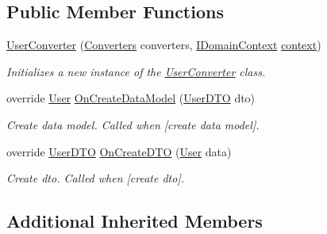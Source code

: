 \subsection*{Public Member Functions}
\begin{DoxyCompactItemize}
\item 
\mbox{\hyperlink{class_bar_none_1_1_shared_1_1_data_converters_1_1_user_converter_a385883407cacbab2b835fc9c41d911bc}{User\+Converter}} (\mbox{\hyperlink{class_bar_none_1_1_shared_1_1_data_converters_1_1_converters}{Converters}} converters, \mbox{\hyperlink{interface_bar_none_1_1_shared_1_1_core_1_1_i_domain_context}{I\+Domain\+Context}} \mbox{\hyperlink{class_bar_none_1_1_shared_1_1_data_converter_1_1_core_1_1_base_data_converter_ae96bc28386162a9cff2a303c270a12b4}{context}})
\begin{DoxyCompactList}\small\item\em Initializes a new instance of the \mbox{\hyperlink{class_bar_none_1_1_shared_1_1_data_converters_1_1_user_converter}{User\+Converter}} class. \end{DoxyCompactList}\item 
override \mbox{\hyperlink{class_bar_none_1_1_shared_1_1_domain_model_1_1_user}{User}} \mbox{\hyperlink{class_bar_none_1_1_shared_1_1_data_converters_1_1_user_converter_a59e4e84a4654b39f8036433a08ee00bc}{On\+Create\+Data\+Model}} (\mbox{\hyperlink{class_bar_none_1_1_shared_1_1_data_transfer_1_1_user_d_t_o}{User\+D\+TO}} dto)
\begin{DoxyCompactList}\small\item\em Create data model. Called when \mbox{[}create data model\mbox{]}. \end{DoxyCompactList}\item 
override \mbox{\hyperlink{class_bar_none_1_1_shared_1_1_data_transfer_1_1_user_d_t_o}{User\+D\+TO}} \mbox{\hyperlink{class_bar_none_1_1_shared_1_1_data_converters_1_1_user_converter_aa9e01fffbfbb0773c0183f81def892f5}{On\+Create\+D\+TO}} (\mbox{\hyperlink{class_bar_none_1_1_shared_1_1_domain_model_1_1_user}{User}} data)
\begin{DoxyCompactList}\small\item\em Create dto. Called when \mbox{[}create dto\mbox{]}. \end{DoxyCompactList}\end{DoxyCompactItemize}
\subsection*{Additional Inherited Members}


